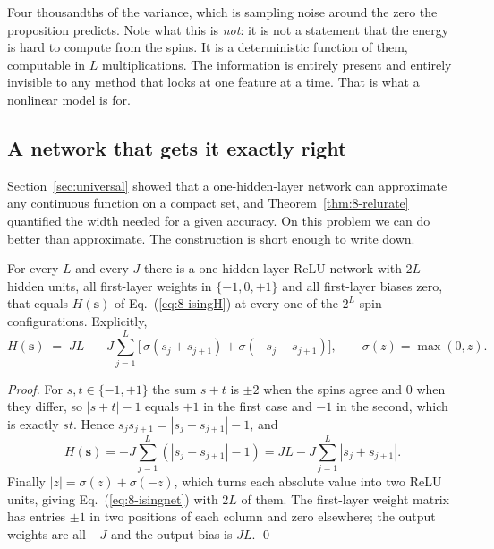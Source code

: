 Four thousandths of the variance, which is sampling noise around the zero the
proposition predicts.  Note what this is \emph{not}: it is not a statement
that the energy is hard to compute from the spins.  It is a deterministic
function of them, computable in $L$ multiplications.  The information is
entirely present and entirely invisible to any method that looks at one
feature at a time.  That is what a nonlinear model is for.

\subsection{A network that gets it exactly right}
\label{sec:isingexact}

Section~\ref{sec:universal} showed that a one-hidden-layer network can
approximate any continuous function on a compact set, and
Theorem~\ref{thm:8-relurate} quantified the width needed for a given accuracy.
On this problem we can do better than approximate.  The construction is short
enough to write down.

\begin{proposition}
\label{prop:8-isingexact}
For every $L$ and every $J$ there is a one-hidden-layer ReLU network with
$2L$ hidden units, all first-layer weights in $\{-1,0,+1\}$ and all
first-layer biases zero, that equals $H(\bm{s})$ of Eq.~(\ref{eq:8-isingH})
at every one of the $2^{L}$ spin configurations.  Explicitly,
\begin{equation}
  H(\bm{s}) \;=\; JL \;-\; J\sum_{j=1}^{L}
    \Big[\,\sigma\!\left(s_j+s_{j+1}\right)
        + \sigma\!\left(-s_j-s_{j+1}\right)\Big],
  \qquad \sigma(z)=\max(0,z).
  \label{eq:8-isingnet}
\end{equation}
\end{proposition}

\begin{proof}
For $s,t\in\{-1,+1\}$ the sum $s+t$ is $\pm2$ when the spins agree and $0$ when
they differ, so $|s+t|-1$ equals $+1$ in the first case and $-1$ in the
second, which is exactly $st$.  Hence $s_js_{j+1}=|s_j+s_{j+1}|-1$, and
\begin{equation}
  H(\bm{s}) = -J\sum_{j=1}^{L}\left(\left|s_j+s_{j+1}\right|-1\right)
            = JL - J\sum_{j=1}^{L}\left|s_j+s_{j+1}\right| .
  \label{eq:8-isingabs}
\end{equation}
Finally $|z|=\sigma(z)+\sigma(-z)$, which turns each absolute value into two
ReLU units, giving Eq.~(\ref{eq:8-isingnet}) with $2L$ of them.  The
first-layer weight matrix has entries $\pm1$ in two positions of each column
and zero elsewhere; the output weights are all $-J$ and the output bias is
$JL$.
\qed
\end{proof}

